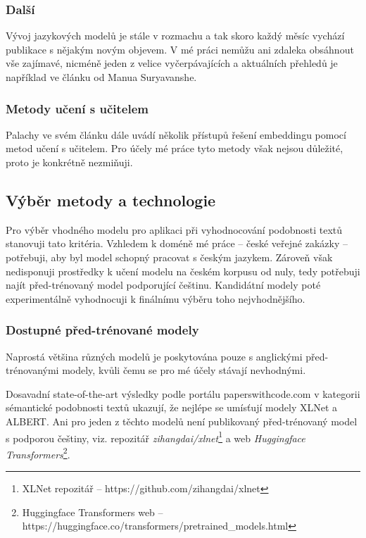 \documentclass[thesis=M,czech]{FITthesis}[2019/12/23]
\begin{document}
\subsubsection*{Další}
Vývoj jazykových modelů je stále v rozmachu a tak skoro každý měsíc vychází publikace s nějakým novým objevem. V mé práci nemůžu ani zdaleka obsáhnout vše zajímavé, nicméně jeden z velice vyčerpávajících a aktuálních přehledů je například ve článku\cite{suryavansh2020} od Manua Suryavanshe.

\subsubsection{Metody učení s učitelem}
Palachy ve svém článku\cite{palachy2019} dále uvádí několik přístupů řešení embeddingu pomocí metod učení s učitelem. Pro účely mé práce tyto metody však nejsou důležité, proto je konkrétně nezmiňuji.

\newpage
\subsection{Výběr metody a technologie}
Pro výběr vhodného modelu pro aplikaci při vyhodnocování podobnosti textů stanovuji tato kritéria. Vzhledem k doméně mé práce -- české veřejné zakázky -- potřebuji, aby byl model schopný pracovat s českým jazykem. Zároveň však nedisponuji prostředky k učení modelu na českém korpusu od nuly, tedy potřebuji najít před-trénovaný model podporující češtinu. Kandidátní modely poté experimentálně vyhodnocuji k finálnímu výběru toho nejvhodnějšího.

\subsubsection{Dostupné před-trénované modely}
Naprostá většina různých modelů je poskytována pouze s anglickými před-trénovanými modely, kvůli čemu se pro mé účely stávají nevhodnými.

Dosavadní state-of-the-art výsledky podle portálu paperswithcode.com v kategorii sémantické podobnosti textů ukazují, že nejlépe se umísťují modely XLNet a ALBERT\cite{lan2019}. Ani pro jeden z těchto modelů není publikovaný před-trénovaný model s podporou češtiny, viz. repozitář \textit{zihangdai/xlnet}\footnote{XLNet repozitář -- https://github.com/zihangdai/xlnet} a web \textit{Huggingface Transformers}\footnote{Huggingface Transformers web -- https://huggingface.co/transformers/pretrained\_models.html}. 
\end{document}
